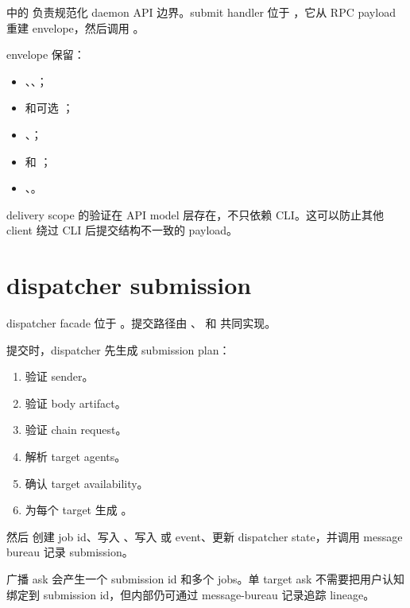  中的  负责规范化 daemon API 边界。submit handler 位于 ，它从 RPC payload 重建 envelope，然后调用 。

envelope 保留：

\begin{itemize}
  \item {}、、；
  \item {} 和可选 ；
  \item {}、；
  \item {} 和 ；
  \item {}、。
\end{itemize}

delivery scope 的验证在 API model 层存在，不只依赖 CLI。这可以防止其他 client 绕过 CLI 后提交结构不一致的 payload。

\section{dispatcher submission}

dispatcher facade 位于 。提交路径由 、 和  共同实现。

提交时，dispatcher 先生成 submission plan：

\begin{enumerate}
  \item 验证 sender。
  \item 验证 body artifact。
  \item 验证 chain request。
  \item 解析 target agents。
  \item 确认 target availability。
  \item 为每个 target 生成 。
\end{enumerate}

然后  创建 job id、写入 、写入  或  event、更新 dispatcher state，并调用 message bureau 记录 submission。

广播 ask 会产生一个 submission id 和多个 jobs。单 target ask 不需要把用户认知绑定到 submission id，但内部仍可通过 message-bureau 记录追踪 lineage。

